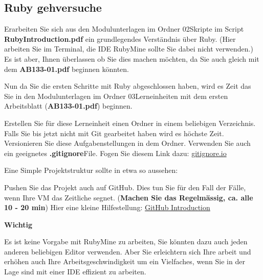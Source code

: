 \subsection{Ruby gehversuche}\label{subsec:rubygehversuche}
\begin{frame}[fragile]
    Erarbeiten Sie sich aus den Modulunterlagen im Ordner 02\textunderscore Skripte im Script \textbf{RubyIntroduction.pdf} ein grundlegendes Verständnis
    über Ruby. (Hier arbeiten Sie im Terminal, die IDE RubyMine sollte Sie dabei nicht verwenden.)
    Es ist aber, Ihnen überlassen ob Sie dies machen möchten, da Sie auch gleich mit dem \textbf{AB133-01.pdf} beginnen könnten.
\end{frame}

\begin{frame}[fragile]
    Nun da Sie die ersten Schritte mit Ruby abgeschlossen haben, wird es Zeit das Sie in den Modulunterlagen im Ordner
    03\textunderscore Lerneinheiten mit dem ersten Arbeitsblatt (\textbf{AB133-01.pdf}) beginnen.

    Erstellen Sie für diese Lerneinheit einen Ordner in einem beliebigen Verzeichnis.
    Falls Sie bis jetzt nicht mit Git gearbeitet haben wird es höchste Zeit.
    Versionieren Sie diese Aufgabenstellungen in dem Ordner.
    Verwenden Sie auch ein geeignetes \textbf{.gitignore}\space File.
    Fogen Sie diesem Link dazu: \href{https://www.toptal.com/developers/gitignore}{gitignore.io}

    Eine Simple Projektstruktur sollte in etwa so aussehen:

    Pushen Sie das Projekt auch auf GitHub.
    Dies tun Sie für den Fall der Fälle, wenn Ihre VM das Zeitliche segnet. (\textbf{Machen Sie das Regelmässig, ca. alle 10 - 20 min})
    Hier eine kleine Hilfestellung: \href{https://lab.github.com/githubtraining/introduction-to-github}{GitHub Introduction}

    \textbf{Wichtig}
    \vSpaceStyle{0.1em}

    Es ist keine Vorgabe mit RubyMine zu arbeiten, Sie könnten dazu auch jeden anderen beliebigen Editor verwenden.
    Aber Sie erleichtern sich Ihre arbeit und erhöhen auch Ihre Arbeitsgeschwindigkeit um ein Vielfaches, wenn Sie in der Lage
    sind mit einer IDE effizient zu arbeiten.
\end{frame}